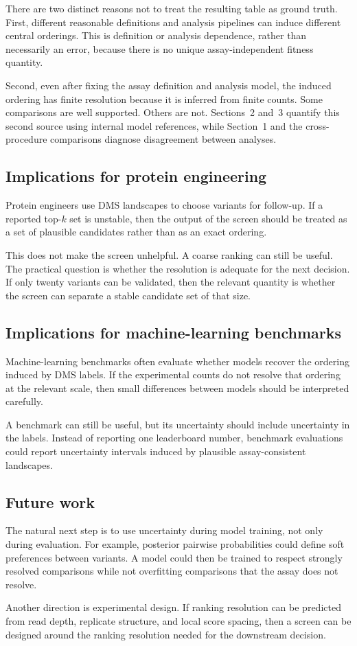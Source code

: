 \documentclass[11pt]{article}
\begin{document}
There are two distinct reasons not to treat the resulting table as ground truth. First, different reasonable definitions and analysis pipelines can induce different central orderings. This is definition or analysis dependence, rather than necessarily an error, because there is no unique assay-independent fitness quantity.

Second, even after fixing the assay definition and analysis model, the induced ordering has finite resolution because it is inferred from finite counts. Some comparisons are well supported. Others are not. Sections~2 and~3 quantify this second source using internal model references, while Section~1 and the cross-procedure comparisons diagnose disagreement between analyses.

\subsection*{Implications for protein engineering}

Protein engineers use DMS landscapes to choose variants for follow-up. If a reported top-$k$ set is unstable, then the output of the screen should be treated as a set of plausible candidates rather than as an exact ordering.

This does not make the screen unhelpful. A coarse ranking can still be useful. The practical question is whether the resolution is adequate for the next decision. If only twenty variants can be validated, then the relevant quantity is whether the screen can separate a stable candidate set of that size.

\subsection*{Implications for machine-learning benchmarks}

Machine-learning benchmarks often evaluate whether models recover the ordering induced by DMS labels. If the experimental counts do not resolve that ordering at the relevant scale, then small differences between models should be interpreted carefully.

A benchmark can still be useful, but its uncertainty should include uncertainty in the labels. Instead of reporting one leaderboard number, benchmark evaluations could report uncertainty intervals induced by plausible assay-consistent landscapes.

\subsection*{Future work}

The natural next step is to use uncertainty during model training, not only during evaluation. For example, posterior pairwise probabilities could define soft preferences between variants. A model could then be trained to respect strongly resolved comparisons while not overfitting comparisons that the assay does not resolve.

Another direction is experimental design. If ranking resolution can be predicted from read depth, replicate structure, and local score spacing, then a screen can be designed around the ranking resolution needed for the downstream decision.
\end{document}
